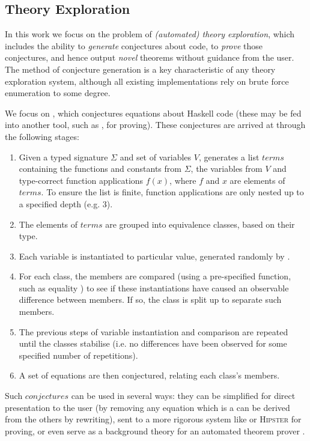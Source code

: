 \subsection{Theory Exploration}
\label{sec:theoryexploration}

\newcommand{\blank}{\cdot}

In this work we focus on the problem of \emph{(automated) theory exploration}, which includes the ability to \emph{generate} conjectures about code, to \emph{prove} those conjectures, and hence output \emph{novel} theorems without guidance from the user. The method of conjecture generation is a key characteristic of any theory exploration system, although all existing implementations rely on brute force enumeration to some degree.

We focus on \qspec{} \citep{QuickSpec}, which conjectures equations about Haskell code (these may be fed into another tool, such as \hspec{}, for proving). These conjectures are arrived at through the following stages:

\begin{enumerate}
  \item Given a typed signature $\Sigma$ and set of variables $V$, \qspec{} generates a list $terms$ containing the functions and constants from $\Sigma$, the variables from $V$ and type-correct function applications $f(x)$, where $f$ and $x$ are elements of $terms$. To ensure the list is finite, function applications are only nested up to a specified depth (e.g. 3).
  \item The elements of $terms$ are grouped into equivalence classes, based on their type.
  \item Each variable is instantiated to particular value, generated randomly by \qcheck{}.
  \item For each class, the members are compared (using a pre-specified function, such as equality \hs{==}) to see if these instantiations have caused an observable difference between members. If so, the class is split up to separate such members.
  \item The previous steps of variable instantiation and comparison are repeated until the classes stabilise (i.e. no differences have been observed for some specified number of repetitions).
  \item A set of equations are then conjectured, relating each class's members.
\end{enumerate}

Such $conjectures$ can be used in several ways: they can be simplified for direct presentation to the user (by removing any equation which is a can be derived from the others by rewriting), sent to a more rigorous system like \hspec{} or \textsc{Hipster} for proving, or even serve as a background theory for an automated theorem prover \citep{claessen2013automating}.

